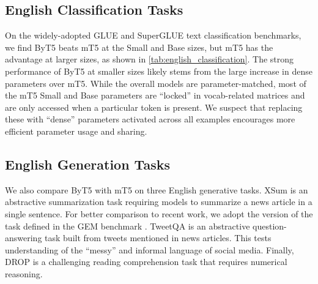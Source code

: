 \documentclass[11pt,a4paper]{article}
\begin{document}
\subsection{English Classification Tasks}

\begin{table}[t!]
\centering
{}
\caption{mT5 and ByT5 performance on GLUE and SuperGLUE\@. For each benchmark, we fine-tune a single model on a mixture of all tasks, select the best checkpoint per task based on validation set performance, and report average validation set scores over all tasks.}
\label{tab:english_classification}
\end{table} 
On the widely-adopted GLUE \cite{wang2019glue} and SuperGLUE \cite{wang2019superglue} text classification benchmarks, we find ByT5 beats mT5 at the Small and Base sizes, but mT5 has the advantage at larger sizes, as shown in \cref{tab:english_classification}. The strong performance of ByT5 at smaller sizes likely stems from the large increase in dense parameters over mT5. While the overall models are parameter-matched, most of the mT5 Small and Base parameters are ``locked'' in vocab-related matrices and are only accessed when a particular token is present. We suspect that replacing these with ``dense'' parameters activated across all examples encourages more efficient parameter usage and sharing.

\subsection{English Generation Tasks}

We also compare ByT5 with mT5 on three English generative tasks. XSum \cite{narayan-etal-2018-dont} is an abstractive summarization task requiring models to summarize a news article in a single sentence. For better comparison to recent work, we adopt the version of the task defined in the GEM benchmark \cite{gehrmann2021gem}. TweetQA \cite{xiong-etal-2019-tweetqa} is an abstractive question-answering task built from tweets mentioned in news articles. This tests understanding of the ``messy'' and informal language of social media. Finally, DROP \cite{dua-etal-2019-drop} is a challenging reading comprehension task that requires numerical reasoning.
\end{document}
